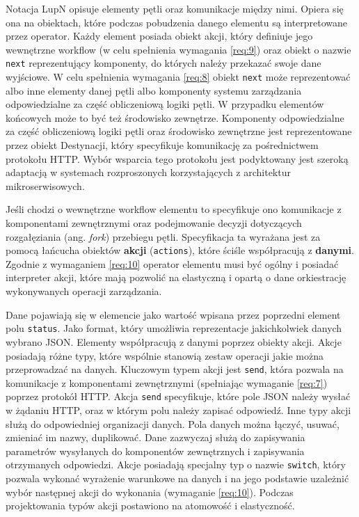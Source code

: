 Notacja LupN opisuje elementy pętli oraz komunikacje między nimi. Opiera się ona na obiektach, które podczas pobudzenia danego elementu są interpretowane przez operator. Każdy element posiada obiekt akcji, który definiuje jego wewnętrzne workflow (w celu spełnienia wymagania \ref{req:9}) oraz obiekt o nazwie \texttt{next} reprezentujący komponenty, do których należy przekazać swoje dane wyjściowe. W celu spełnienia wymagania \ref{req:8} obiekt \texttt{next} może reprezentować albo inne elementy danej pętli albo komponenty systemu zarządzania odpowiedzialne za część obliczeniową logiki pętli. W przypadku elementów końcowych może to być też środowisko zewnętrze. Komponenty odpowiedzialne za część obliczeniową logiki pętli oraz środowisko zewnętrzne jest reprezentowane przez obiekt Destynacji, który specyfikuje komunikację za pośrednictwem protokołu HTTP. Wybór wsparcia tego protokołu jest podyktowany jest szeroką adaptacją w systemach rozproszonych korzystających z architektur mikroserwisowych.

Jeśli chodzi o wewnętrzne workflow elementu to specyfikuje ono komunikacje z komponentami zewnętrznymi oraz podejmowanie decyzji dotyczących rozgałęziania (ang. \textit{fork}) przebiegu pętli. Specyfikacja ta wyrażana jest za pomocą łańcucha obiektów \textbf{akcji} (\texttt{actions}), które ściśle współpracują z \textbf{danymi}. Zgodnie z wymaganiem \ref{req:10} operator elementu musi być ogólny i posiadać interpreter akcji, które mają pozwolić na elastyczną i opartą o dane orkiestrację wykonywanych operacji zarządzania. 

Dane pojawiają się w elemencie jako wartość wpisana przez poprzedni element polu \texttt{status}. Jako format, który umożliwia reprezentacje jakichkolwiek danych wybrano JSON. Elementy współpracują z danymi poprzez obiekty akcji. Akcje posiadają różne typy, które wspólnie stanowią zestaw operacji jakie można przeprowadzać na danych. Kluczowym typem akcji jest \texttt{send}, która pozwala na komunikacje z komponentami zewnętrznymi (spełniając wymaganie \ref{req:7}) poprzez protokół HTTP. Akcja \texttt{send} specyfikuje, które pole JSON należy wysłać w żądaniu HTTP, oraz w którym polu należy zapisać odpowiedź. Inne typy akcji służą do odpowiedniej organizacji danych. Pola danych można łączyć, usuwać, zmieniać im nazwy, duplikować. Dane zazwyczaj służą do zapisywania parametrów wysyłanych do komponentów zewnętrznych i zapisywania otrzymanych odpowiedzi. Akcje posiadają specjalny typ o nazwie \texttt{switch}, który pozwala wykonać wyrażenie warunkowe na danych i na jego podstawie uzależnić wybór następnej akcji do wykonania (wymaganie \ref{req:10}). Podczas projektowania typów akcji postawiono na atomowość i elastyczność.

